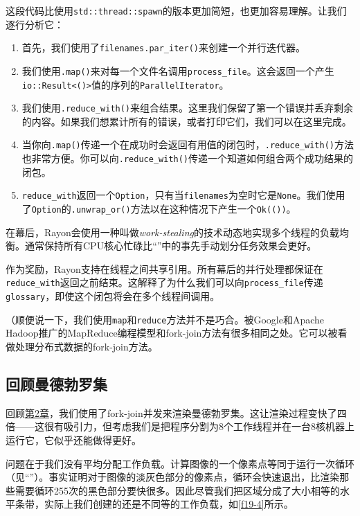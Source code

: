 这段代码比使用\texttt{std::thread::spawn}的版本更加简短，也更加容易理解。让我们逐行分析它：
\begin{enumerate}
    \item 首先，我们使用了\texttt{filenames.par\_iter()}来创建一个并行迭代器。
    \item 我们使用\texttt{.map()}来对每一个文件名调用\texttt{process\_file}。这会返回一个产生\texttt{io::Result<()>}值的序列的\texttt{ParallelIterator}。
    \item 我们使用\texttt{.reduce\_with()}来组合结果。这里我们保留了第一个错误并丢弃剩余的内容。如果我们想累计所有的错误，或者打印它们，我们可以在这里完成。
    \item 当你向\texttt{.map()}传递一个在成功时会返回有用值的闭包时，\texttt{.reduce\_with()}方法也非常方便。你可以向\texttt{.reduce\_with()}传递一个知道如何组合两个成功结果的闭包。
    \item \texttt{reduce\_with}返回一个\texttt{Option}，只有当\texttt{filenames}为空时它是\texttt{None}。我们使用了\texttt{Option}的\texttt{.unwrap\_or()}方法以在这种情况下产生一个\texttt{Ok(())}。
\end{enumerate}

在幕后，Rayon会使用一种叫做\emph{work-stealing}的技术动态地实现多个线程的负载均衡。通常保持所有CPU核心忙碌比“”中的事先手动划分任务效果会更好。

作为奖励，Rayon支持在线程之间共享引用。所有幕后的并行处理都保证在\texttt{reduce\_with}返回之前结束。这解释了为什么我们可以向\texttt{process\_file}传递\texttt{glossary}，即使这个闭包将会在多个线程间调用。

（顺便说一下，我们使用\texttt{map}和\texttt{reduce}方法并不是巧合。被Google和Apache Hadoop推广的MapReduce编程模型和fork-join方法有很多相同之处。它可以被看做处理分布式数据的fork-join方法。

\subsection{回顾曼德勃罗集}
回顾\hyperref[ch02]{第2章}，我们使用了fork-join并发来渲染曼德勃罗集。这让渲染过程变快了四倍——这很有吸引力，但考虑我们是把程序分割为8个工作线程并在一台8核机器上运行它，它似乎还能做得更好。

问题在于我们没有平均分配工作负载。计算图像的一个像素点等同于运行一次循环（见“”）。事实证明对于图像的淡灰色部分的像素点，循环会快速退出，比渲染那些需要循环255次的黑色部分要快很多。因此尽管我们把区域分成了大小相等的水平条带，实际上我们创建的还是不同等的工作负载，如\autoref{f19-4}所示。

